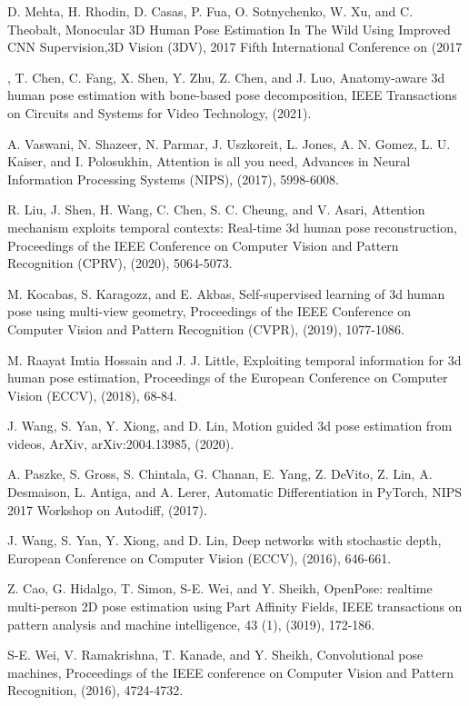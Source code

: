 \documentclass{article}
\begin{document}
\begin{thebibliography}{9}
 D. Mehta, H. Rhodin, D. Casas, P. Fua, O. Sotnychenko, W. Xu, and C. Theobalt, Monocular 3D Human Pose Estimation In The Wild Using Improved CNN Supervision,3D Vision (3DV), 2017 Fifth International Conference on (2017


, T. Chen, C. Fang, X. Shen, Y. Zhu, Z. Chen, and J. Luo, Anatomy-aware 3d human pose estimation with bone-based pose decomposition, IEEE Transactions on Circuits and Systems for Video Technology, (2021).

 A. Vaswani, N. Shazeer, N. Parmar, J. Uszkoreit, L. Jones, A. N. Gomez, L. U. Kaiser, and I. Polosukhin, Attention is all you need, Advances in Neural Information Processing Systems (NIPS), (2017), 5998-6008.

 R. Liu, J. Shen, H. Wang, C. Chen, S. C. Cheung, and V. Asari, Attention mechanism exploits temporal contexts: Real-time 3d human pose reconstruction, Proceedings of the IEEE Conference on Computer Vision and Pattern Recognition (CPRV), (2020), 5064-5073.

 M. Kocabas, S. Karagozz, and E. Akbas, Self-supervised learning of 3d human pose using multi-view geometry, Proceedings of the IEEE Conference on Computer Vision and Pattern Recognition (CVPR), (2019), 1077-1086.

 M. Raayat Imtia Hossain and J. J. Little, Exploiting temporal information for 3d human pose estimation, Proceedings of the European Conference on Computer Vision (ECCV), (2018), 68-84.

 J. Wang, S. Yan, Y. Xiong, and D. Lin, Motion guided 3d pose estimation from videos, ArXiv, arXiv:2004.13985, (2020).

 A. Paszke, S. Gross, S. Chintala, G. Chanan, E. Yang, Z. DeVito, Z. Lin, A. Desmaison, L. Antiga, and A. Lerer, Automatic Differentiation in PyTorch, NIPS 2017 Workshop on Autodiff, (2017).

 J. Wang, S. Yan, Y. Xiong, and D. Lin, Deep networks with stochastic depth, European Conference on Computer Vision (ECCV), (2016), 646-661.

 Z. Cao, G. Hidalgo, T. Simon, S-E. Wei, and Y. Sheikh, OpenPose: realtime multi-person 2D pose estimation using Part Affinity Fields, IEEE transactions on pattern analysis and machine intelligence, 43 (1), (3019), 172-186.

 S-E. Wei, V. Ramakrishna, T. Kanade, and Y. Sheikh, Convolutional pose machines, Proceedings of the IEEE conference on Computer Vision and Pattern Recognition, (2016), 4724-4732.


\end{thebibliography}
\end{document}
